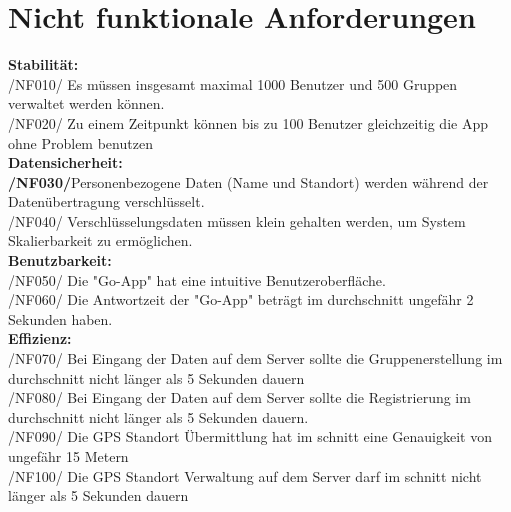 \section{Nicht funktionale Anforderungen}
\textbf{Stabilität:}\\
/NF010/	Es müssen insgesamt maximal 1000 Benutzer und 500 Gruppen verwaltet werden können. \\
/NF020/	Zu einem Zeitpunkt können bis zu 100 Benutzer gleichzeitig die App ohne Problem benutzen \\

\textbf{Datensicherheit:}\\
\textbf{/NF030/}Personenbezogene Daten (Name und Standort) werden während der Datenübertragung verschlüsselt.\\
/NF040/	Verschlüsselungsdaten müssen klein gehalten werden, um System Skalierbarkeit zu ermöglichen.\\

\textbf{Benutzbarkeit:}\\
/NF050/	Die "Go-App" hat eine intuitive Benutzeroberfläche.\\
/NF060/	Die Antwortzeit der "Go-App" beträgt im durchschnitt ungefähr 2 Sekunden haben.\\

\textbf{Effizienz:}\\
/NF070/	Bei Eingang der Daten auf dem Server sollte die Gruppenerstellung im durchschnitt nicht länger als 5 Sekunden dauern\\
/NF080/	Bei Eingang der Daten auf dem Server sollte die Registrierung im durchschnitt nicht länger als 5 Sekunden dauern.\\
/NF090/	Die GPS Standort Übermittlung hat im schnitt eine Genauigkeit von ungefähr 15 Metern \\
/NF100/	Die GPS Standort Verwaltung auf dem Server darf im schnitt nicht länger als 5 Sekunden dauern  \\

